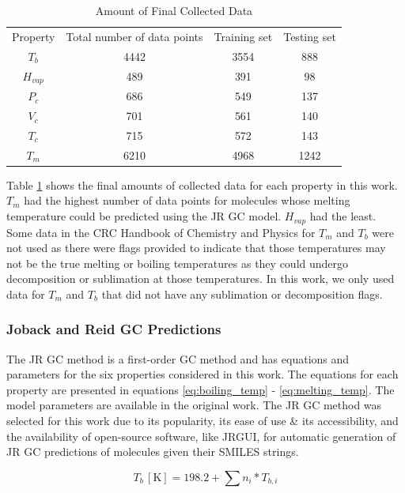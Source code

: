 \documentclass[journal=jacsat,manuscript=article]{achemso}
\begin{document}
\begin{table}
    \centering
    \begin{tabular}{cccc}
         Property&  Total number of data points&  Training set& Testing set
         
\\
         $T_b$&  4442&  3554& 888
\\
         $H_{vap}$&  489&  391& 98
\\
         $P_c$&  686&  549& 137
\\
         $V_c$&  701&  561& 140
\\
         $T_c$&  715&  572& 143
\\
         $T_m$&  6210&  4968& 1242
\\
    \end{tabular}
    \caption{Amount of Final Collected Data}
    \label{tab:collected_data}
\end{table}

Table \ref{tab:collected_data} shows the final amounts of collected data for each property in this work. $T_m$ had the highest number of data points for molecules whose melting temperature could be predicted using the JR GC model. $H_{vap}$ had the least. Some data in the CRC Handbook of Chemistry and Physics for $T_m$ and $T_b$ were not used as there were flags provided to indicate that those temperatures may not be the true melting or boiling temperatures as they could undergo decomposition or sublimation at those temperatures. In this work, we only used data for $T_m$ and $T_b$ that did not have any sublimation or decomposition flags.

\subsubsection{Joback and Reid GC Predictions}
The JR GC method is a first-order GC method and has equations and parameters for the six properties considered in this work. The equations for each property are presented in equations \ref{eq:boiling_temp} - \ref{eq:melting_temp}. The model parameters are available in the original work.
The JR GC method was selected for this work due to its popularity, its ease of use \& its accessibility, and the availability of open-source software, like JRGUI, for automatic generation of JR GC predictions of molecules given their SMILES strings.

\begin{equation}
    T_b \, [\text{K}] = 198.2 + \sum n_{i} * T_{b,i}
    \label{eq:boiling_temp}
\end{equation}
\end{document}
